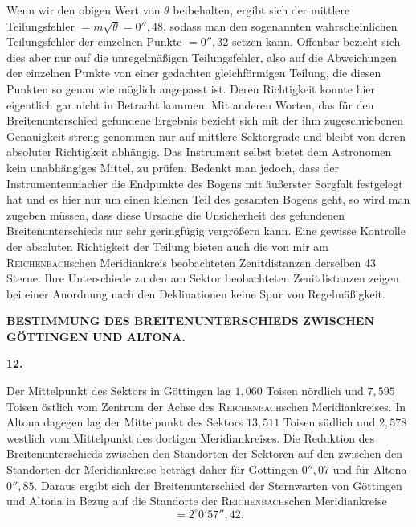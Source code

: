 Wenn wir den obigen Wert von \(\theta\) beibehalten, ergibt sich der mittlere
Teilungsfehler \(=m\surd\theta=0''{,}48\), sodass man den sogenannten wahrscheinlichen
Teilungsfehler der einzelnen Punkte \(=0''{,}32\) setzen kann. Offenbar
bezieht sich dies aber nur auf die unregelmäßigen Teilungsfehler, also auf
die Abweichungen der einzelnen Punkte von einer gedachten gleichförmigen
Teilung, die diesen Punkten so genau wie möglich angepasst ist. Deren
 Richtigkeit konnte hier eigentlich gar nicht in Betracht kommen.
Mit anderen Worten, das für den Breitenunterschied gefundene Ergebnis bezieht
sich mit der ihm zugeschriebenen Genauigkeit streng genommen nur auf mittlere
Sektorgrade und bleibt von deren absoluter Richtigkeit abhängig.
Das Instrument selbst bietet dem Astronomen kein unabhängiges Mittel,
 zu prüfen. Bedenkt man jedoch, dass der Instrumentenmacher die Endpunkte
des Bogens mit äußerster Sorgfalt festgelegt hat und es hier nur um
einen kleinen Teil des gesamten Bogens geht, so wird man zugeben müssen,
dass diese Ursache die Unsicherheit des gefundenen Breitenunterschieds
nur sehr geringfügig vergrößern kann. Eine gewisse Kontrolle der absoluten
Richtigkeit der Teilung bieten auch die von mir am \textsc{Reichenbach}schen
Meridiankreis beobachteten Zenitdistanzen derselben 43 Sterne.
Ihre Unterschiede zu den am Sektor beobachteten Zenitdistanzen zeigen
bei einer Anordnung nach den Deklinationen
keine Spur von Regelmäßigkeit.

\par\clearpage
\noindent{}\parbox[t]{\dimexpr\linewidth-24mm\relax}{\centering\scriptsize\bfseries BESTIMMUNG DES BREITENUNTERSCHIEDS ZWISCHEN GÖTTINGEN UND ALTONA.}\makebox[12mm][r]{}\par\medskip

\begin{center}\textbf{12.}\end{center}

Der Mittelpunkt des Sektors in Göttingen lag \(1{,}060\) Toisen
nördlich und \(7{,}595\) Toisen östlich vom Zentrum der Achse des \textsc{Reichenbach}schen
Meridiankreises. In Altona dagegen lag der Mittelpunkt des Sektors \(13{,}511\)
Toisen südlich und \(2{,}578\) westlich vom Mittelpunkt des dortigen
Meridiankreises. Die Reduktion des Breitenunterschieds zwischen den Standorten der
Sektoren auf den zwischen den Standorten der Meridiankreise beträgt daher für Göttingen \(0''{,}07\) und für Altona \(0''{,}85\).
Daraus ergibt sich der Breitenunterschied der Sternwarten von Göttingen und Altona
in Bezug auf die Standorte der \textsc{Reichenbach}schen Meridiankreise
\[
=2^\circ0'57''{,}42.
\]

